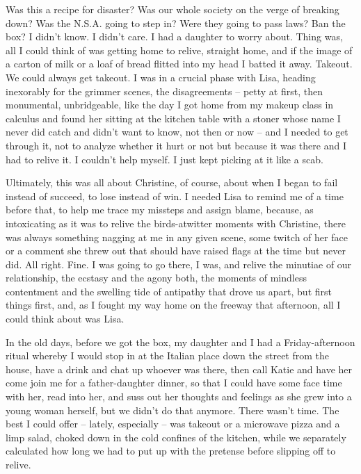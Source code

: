 \documentclass[11pt,a4paper]{article}
\begin{document}
Was this a recipe for disaster? Was our whole society on the verge of breaking down? Was the N.S.A. going to step in? Were they going to pass laws? Ban the box? I didn't know. I didn't care. I had a daughter to worry about. Thing was, all I could think of was getting home to relive, straight home, and if the image of a carton of milk or a loaf of bread flitted into my head I batted it away. Takeout. We could always get takeout. I was in a crucial phase with Lisa, heading inexorably for the grimmer scenes, the disagreements – petty at first, then monumental, unbridgeable, like the day I got home from my makeup class in calculus and found her sitting at the kitchen table with a stoner whose name I never did catch and didn't want to know, not then or now – and I needed to get through it, not to analyze whether it hurt or not but because it was there and I had to relive it. I couldn't help myself. I just kept picking at it like a scab.

Ultimately, this was all about Christine, of course, about when I began to fail instead of succeed, to lose instead of win. I needed Lisa to remind me of a time before that, to help me trace my missteps and assign blame, because, as intoxicating as it was to relive the birds-atwitter moments with Christine, there was always something nagging at me in any given scene, some twitch of her face or a comment she threw out that should have raised flags at the time but never did. All right. Fine. I was going to go there, I was, and relive the minutiae of our relationship, the ecstasy and the agony both, the moments of mindless contentment and the swelling tide of antipathy that drove us apart, but first things first, and, as I fought my way home on the freeway that afternoon, all I could think about was Lisa.

In the old days, before we got the box, my daughter and I had a Friday-afternoon ritual whereby I would stop in at the Italian place down the street from the house, have a drink and chat up whoever was there, then call Katie and have her come join me for a father-daughter dinner, so that I could have some face time with her, read into her, and suss out her thoughts and feelings as she grew into a young woman herself, but we didn't do that anymore. There wasn't time. The best I could offer – lately, especially – was takeout or a microwave pizza and a limp salad, choked down in the cold confines of the kitchen, while we separately calculated how long we had to put up with the pretense before slipping off to relive.
\end{document}
